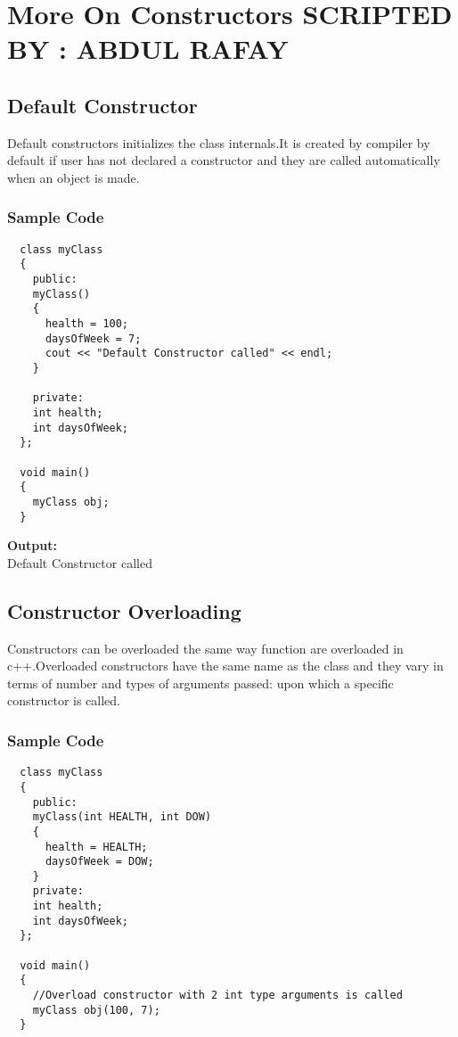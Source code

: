 \documentclass[11pt,fleqn]{book} %
\begin{document}
\newpage

\chapter{More On Constructors \hspace{32mm} {\textsc{\small SCRIPTED BY : ABDUL RAFAY}}}
\section{Default Constructor} 
Default constructors initializes the class internals.It is created by compiler by default if user has not declared a constructor and they are called automatically when an object is made.

\subsection{Sample Code}
\begin{lstlisting}
  class myClass
  {
    public:
    myClass()
    {
      health = 100;
      daysOfWeek = 7;
      cout << "Default Constructor called" << endl;
    }
    
    private:
    int health;
    int daysOfWeek;
  };
  
  void main()
  {
    myClass obj;
  }
\end{lstlisting}
\textbf{Output:} \\
Default Constructor called\\

\section{Constructor Overloading}
Constructors can be overloaded the same way function are overloaded in c++.Overloaded constructors have the same name as the class and they vary in terms of number and types of arguments passed: upon which a specific constructor is called.

\subsection{Sample Code}
\begin{lstlisting}
  class myClass
  {
    public:
    myClass(int HEALTH, int DOW)
    {
      health = HEALTH;
      daysOfWeek = DOW;
    }
    private:
    int health;
    int daysOfWeek;
  };
  
  void main()
  {
    //Overload constructor with 2 int type arguments is called
    myClass obj(100, 7);  
  }
\end{lstlisting}
\end{document}
